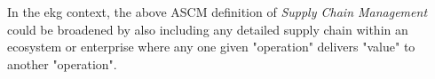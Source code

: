 %
%

\ekgmmContextSection

In the \gls{ekg} context, the above ASCM definition of \textit{Supply Chain Management} could be broadened
by also including any detailed supply chain within an ecosystem or enterprise where any one given "operation"
delivers "value" to another "operation".

